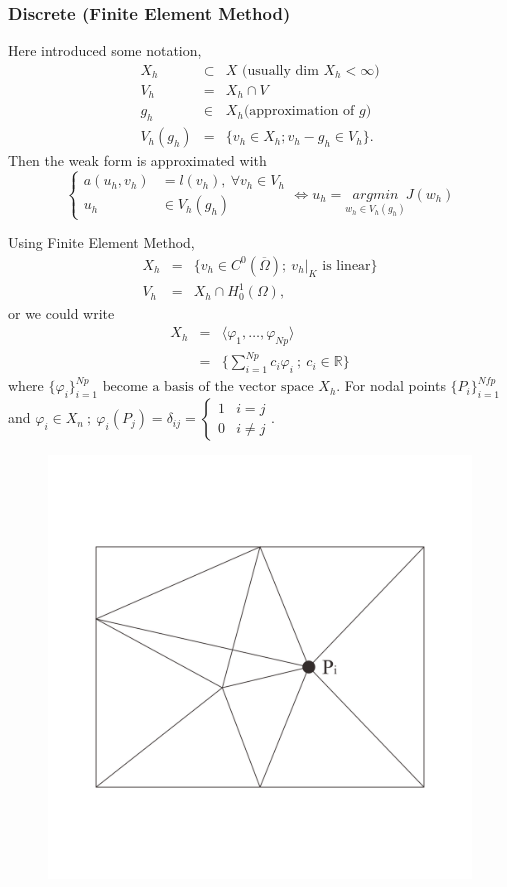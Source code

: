 \documentclass[a4paper,10pt]{article}
\begin{document}
\subsubsection{Discrete (Finite Element Method)}
Here introduced some notation,
\begin{eqnarray}\nonumber
X_{h} &\subset & X \text{ (usually dim } X_{h} < \infty \text{)} \\ \nonumber
V_{h} & = & X_{h} \cap V\\ \nonumber
g_{h} & \in & X_{h} \text{(approximation of } g \text{)} \\ \nonumber
V_{h}(g_{h}) & = & \{ v_{h} \in X_{h} ; v_{h}-g_{h} \in V_{h} \}.
\end{eqnarray}
Then the weak form is approximated with
\begin{equation} \nonumber
\begin{cases}
a(u_{h}, v_{h}) &= l(v_{h}), \ \forall v_{h} \in V_{h} \\
u_{h} &\in V_{h}(g_{h})
\end{cases}
\iff u_{h} = \underset{w_{h} \in V_{h}(g_{h})}{argmin}J(w_{h})
\end{equation}

Using Finite Element Method,
\begin{eqnarray}\nonumber
X_{h} &=& \{ v_{h} \in C^{0}(\overline{\Omega}) ; \ {v_{h}|}_{K} \text{ is linear} \} \\ \nonumber
V_{h} &=& X_{h} \cap H_{0}^{1}(\Omega),
\end{eqnarray}
or we could write
\begin{eqnarray} \nonumber
X_h &=& \langle \varphi_1, \dots  , \varphi_{Np} \rangle\\ \nonumber
&=& \{\sum_{i=1}^{Np} c_i\varphi_i \ ; \ c_i \in \mathbb{R} \}
\end{eqnarray}
where $ \{\varphi_i\}^{Np}_{i=1} \text{ become a basis of the vector space } X_h $. For nodal points $ \{P_{i}\}_{i=1}^{Nf{p}} $ and $ \varphi_{i} \in X_{n} \ ; \ \varphi_{i} (P_{j}) = \delta_{ij} = \begin{cases}
1 & i=j \\ 0 & i \neq j
\end{cases} $.

\begin{figure}[h!]
	\centering
	\includegraphics[width=0.55\linewidth]{picture/implement}
	\caption{}
	\label{fig:implement}
\end{figure}
\end{document}
